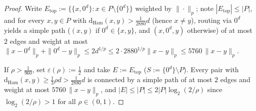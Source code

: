\documentclass[11pt]{article}
\theoremstyle{definition}
\theoremstyle{remark}
\newcommand{\Ham}{\mathrm{Ham}}
\newcommand{\dHam}{\mathrm{d}_{\Ham}}
\begin{document}
\begin{proof}
Write $E_{\mathrm{top}} := \{\{x, 0^d\} : x \in P \setminus \{0^d\}\}$ weighted by $\|\cdot\|_p$; note $|E_{\mathrm{top}}| \le |P|$, and for every $x, y \in P$ with $\dHam(x, y) > \frac{1}{2880} d$ (hence $x \ne y$), routing via $0^d$ yields a simple path ($(x, y)$ if $0^d \in \{x, y\}$, and $(x, 0^d, y)$ otherwise) of at most $2$ edges and weight at most $\|x - 0^d\|_p + \|0^d - y\|_p \le 2 d^{1/p} \le 2 \cdot 2880^{1/p}\|x - y\|_p \le 5760\,\|x - y\|_p$.

If $\rho > \frac{1}{960}$, set $\varepsilon(\rho) := \frac{1}{2}$ and take $E := E_{\mathrm{top}}$ ($S := \{0^d\} \setminus P$). Every pair with $\dHam(x, y) \ge \frac{1}{3}\rho d > \frac{1}{2880} d$ is connected by a simple path of at most $2$ edges and weight at most $5760\,\|x - y\|_p$, and $|E| \le |P| \le 2|P|\log_2(2/\rho)$ since $\log_2(2/\rho) > 1$ for all $\rho \in (0, 1)$.


\end{proof}
\end{document}
